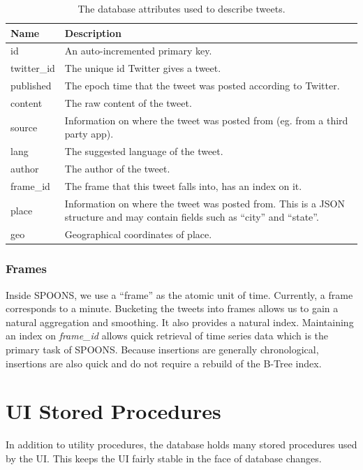 \documentclass[12pt]{ucthesis}
\begin{document}
\begin{table}
   \begin{center}
      \begin{tabular}{|l|p{12cm}|}
         \hline
            Name & Description
         \tabularnewline\hline
            \textsf{id} & An auto-incremented primary key.
         \tabularnewline\hline
            \textsf{twitter\_id} & The unique id Twitter gives a tweet.
         \tabularnewline\hline
            \textsf{published} & The epoch time that the tweet was posted according to Twitter.
         \tabularnewline\hline
            \textsf{content} & The raw content of the tweet.
         \tabularnewline\hline
            \textsf{source} & Information on where the tweet was posted from (eg. from a third party app).
         \tabularnewline\hline
            \textsf{lang} & The suggested language of the tweet.
         \tabularnewline\hline
            \textsf{author} & The author of the tweet.
         \tabularnewline\hline
            \textsf{frame\_id} & The frame that this tweet falls into, has an index on it.
         \tabularnewline\hline
            \textsf{place} & Information on where the tweet was posted from. This is a JSON structure and may contain fields such as ``city'' and ``state''.
         \tabularnewline\hline
            \textsf{geo} & Geographical coordinates of place.
         \tabularnewline\hline
      \end{tabular}
   \end{center}
   \caption[Database Tweet Attributes]{The database attributes used to describe tweets.}
   \label{tweet-attributes}
\end{table}

\subsubsection{Frames}
Inside SPOONS, we use a ``frame'' as the atomic unit of time. Currently, a frame corresponds to a minute. Bucketing the tweets into frames allows us to
gain a natural aggregation and smoothing. It also provides a natural index. Maintaining an index on \textit{frame\_id} allows quick retrieval of
time series data which is the primary task of SPOONS. Because insertions are generally chronological, insertions are also quick and do not require a
rebuild of the B-Tree index\cite{innodb}.

\section{UI Stored Procedures}
\label{arch-database-sp}
In addition to utility procedures, the database holds many stored procedures used by the UI.
This keeps the UI fairly stable in the face of database changes.
\end{document}
